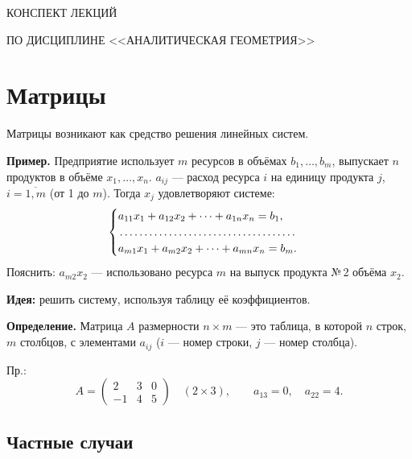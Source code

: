 \documentclass[a4paper, 12pt]{article}
\begin{document}
\begin{center}
{\large КОНСПЕКТ ЛЕКЦИЙ}

ПО ДИСЦИПЛИНЕ <<АНАЛИТИЧЕСКАЯ ГЕОМЕТРИЯ>>

\tableofcontents
\label{contents}

\pagebreak

\end{center}
\vspace{10pt}

\section{Матрицы}

Матрицы возникают как средство решения линейных систем.

\textbf{Пример.} Предприятие использует $m$ ресурсов в объёмах
$b_1, \dots, b_m$, выпускает $n$ продуктов в объёме $x_1, \dots, x_n$.
$a_{ij}$ --- расход ресурса $i$ на единицу продукта $j$, $i = \overline{1, m}$
(от 1 до $m$). Тогда $x_j$ удовлетворяют системе:
\[
  \begin{cases}
    a_{11} x_1 + a_{12} x_2 + \dots + a_{1n} x_n = b_1,\\
    \dotfill\\
    a_{m1} x_1 + a_{m2} x_2 + \dots + a_{mn} x_n = b_m.
  \end{cases}
\]
Пояснить: $a_{m2} x_2$ --- использовано ресурса $m$ на выпуск продукта №\,2
объёма $x_2$.

\textbf{Идея:} решить систему, используя таблицу её коэффициентов.

\textbf{Определение.} Матрица $A$ размерности $n \times m$ --- это таблица,
в которой $n$ строк, $m$ столбцов, с элементами $a_{ij}$
($i$ --- номер строки, $j$ --- номер столбца).

Пр.:
\[
  A = \begin{pmatrix} 2 & 3 & 0 \\ -1 & 4 & 5 \end{pmatrix} \quad (2 \times 3),
  \qquad a_{13} = 0, \quad a_{22} = 4.
\]

\subsection{Частные случаи}
\end{document}
